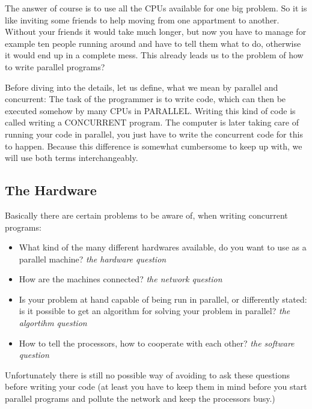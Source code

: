The answer of course is to use all the CPUs available for one big 
problem. So it is like inviting some friends to help moving
from one appartment to another. Without your friends it would 
take much longer, but now you have to manage for example ten people running
around and have to tell them what to do, otherwise it would end up
in a complete mess. This already leads us to the problem of how to write
parallel programs?

Before diving into the details, let us define, what we mean by parallel
and concurrent:
The task of the programmer is to write code, which can then be executed
somehow by many CPUs in PARALLEL. Writing this kind of code is called
writing a CONCURRENT program. The computer is later 
taking care of running your code in parallel, you just have to write 
the concurrent code for this to happen. Because this difference
is somewhat cumbersome to keep up with, we will use both terms
interchangeably.

\subsection{The Hardware}

Basically there are certain problems to be aware of, when writing
concurrent programs: 
\begin{itemize}
\item What kind of the many different hardwares available, do you want 
     to use as a parallel machine?  \emph{the hardware question}
\item How are the machines connected? 
        \emph{the network question}
\item Is your problem at hand capable of being run in parallel, or
        differently stated: is it possible to get an algorithm
        for solving your problem in parallel?
        \emph{the algortihm question}
\item How to tell the processors, how to cooperate with each other?
        \emph{the software question}
\end{itemize}
Unfortunately there is still no possible way of avoiding to ask
these questions before writing your code (at least you have to
keep them in mind before you start parallel programs and pollute the network
and keep the processors busy.)

